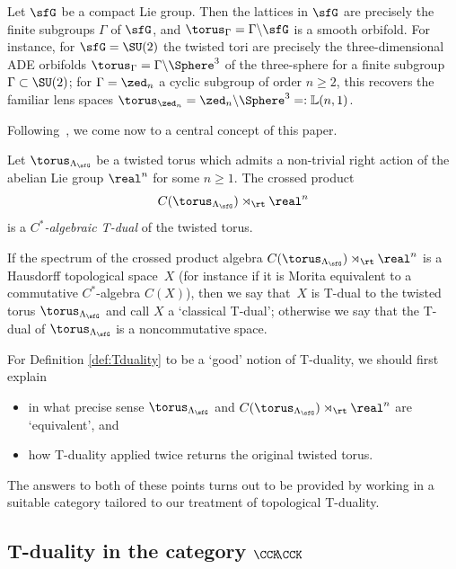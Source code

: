 \begin{Example}[orbifolds]
Let $\sfG$ be a compact Lie group. Then the lattices in $\sfG$ are
precisely the finite subgroups $\Gamma$ of $\sfG$, and
$\torus_\Gamma=\Gamma\backslash\sfG$ is a smooth orbifold. For instance,
for $\sfG=\SU(2)$ the twisted tori are precisely the three-dimensional
ADE orbifolds $\torus_\Gamma=\Gamma\backslash\Sphere^3$
of the three-sphere for a finite subgroup $\Gamma\subset\SU(2)$;
for $\Gamma=\zed_n$ a cyclic subgroup of order $n\geq2$, this recovers
the familiar lens spaces $\torus_{\zed_n}=\zed_n\backslash\Sphere^3=:\mathbb{L}(n,1)$.
\end{Example}

Following~\cite{Mathai2004}, we come now to a central concept of this paper.

\begin{Definition}\label{def:Tduality}
Let $\torus_{\Lambda_\sfG}$ be a twisted torus which admits a
non-trivial right action
of the abelian Lie group $\real^n$ for some $n\geq1$. The crossed product
\[
C(\torus_{\Lambda_\sfG})\rtimes_\rt \real^n
\]
is a \emph{$C^*$-algebraic T-dual} of the twisted torus.
\end{Definition}
If the spectrum of the crossed product algebra $
C(\torus_{\Lambda_\sfG})\rtimes_\rt \real^n
$ is a Hausdorff topological space~$X$ (for instance
if it is Morita
equivalent to a commutative $C^*$-algebra $C(X)$), then we say that~$X$ is T-dual to the
twisted torus $\torus_{\Lambda_\sfG}$ and call $X$ a `classical T-dual'; otherwise we say that the T-dual of
$\torus_{\Lambda_\sfG}$ is a noncommutative space.

For Definition \ref{def:Tduality} to be a `good' notion of T-duality, we should first explain
\begin{itemize}\itemsep=0pt
\item[(a)] in
what precise sense $\torus_{\Lambda_\sfG}$ and
$C(\torus_{\Lambda_\sfG})\rtimes_\rt\real^n$ are `equivalent', and
\item[(b)] how
T-duality applied twice returns the original twisted torus.
\end{itemize}
The answers to both of these points turns out to be provided by
working in a suitable category tailored to our treatment of
topological T-duality.

\subsection[T-duality in the category $\CCK\hspace{-1mm}\CCK$]{T-duality in the category $\CCK\hspace{-1mm}\CCK$}
\label{sec:TdualityKK}

